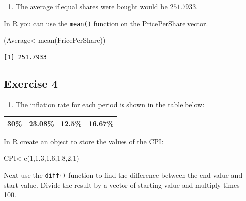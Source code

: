 \documentclass[
  letterpaper,
  DIV=11,
  numbers=noendperiod]{scrreprt}
\newenvironment{Shaded}{\begin{snugshade}}{\end{snugshade}}
\newcommand{\DecValTok}[1]{\textcolor[rgb]{0.68,0.00,0.00}{#1}}
\newcommand{\FloatTok}[1]{\textcolor[rgb]{0.68,0.00,0.00}{#1}}
\newcommand{\FunctionTok}[1]{\textcolor[rgb]{0.28,0.35,0.67}{#1}}
\newcommand{\NormalTok}[1]{\textcolor[rgb]{0.00,0.23,0.31}{#1}}
\newcommand{\OtherTok}[1]{\textcolor[rgb]{0.00,0.23,0.31}{#1}}
\providecommand{\tightlist}{%
  \setlength{\itemsep}{0pt}\setlength{\parskip}{0pt}}\usepackage{longtable,booktabs,array}
\begin{document}
\begin{enumerate}
\def\labelenumi{\arabic{enumi}.}
\setcounter{enumi}{1}
\tightlist
\item
  The average if equal shares were bought would be \(251.7933\).
\end{enumerate}

In R you can use the \texttt{mean()} function on the PricePerShare
vector.

\begin{Shaded}
\begin{Highlighting}[numbers=left,,]
\NormalTok{(Average}\OtherTok{\textless{}{-}}\FunctionTok{mean}\NormalTok{(PricePerShare))}
\end{Highlighting}
\end{Shaded}

\begin{verbatim}
[1] 251.7933
\end{verbatim}

\hypertarget{exercise-4-1}{%
\subsection*{Exercise 4}\label{exercise-4-1}}

\begin{enumerate}
\def\labelenumi{\arabic{enumi}.}
\tightlist
\item
  The inflation rate for each period is shown in the table below:
\end{enumerate}

\begin{longtable}[]{@{}cccc@{}}
\toprule()
\endhead
30\% & 23.08\% & 12.5\% & 16.67\% \\
\bottomrule()
\end{longtable}

In R create an object to store the values of the CPI:

\begin{Shaded}
\begin{Highlighting}[numbers=left,,]
\NormalTok{CPI}\OtherTok{\textless{}{-}}\FunctionTok{c}\NormalTok{(}\DecValTok{1}\NormalTok{,}\FloatTok{1.3}\NormalTok{,}\FloatTok{1.6}\NormalTok{,}\FloatTok{1.8}\NormalTok{,}\FloatTok{2.1}\NormalTok{)}
\end{Highlighting}
\end{Shaded}

Next use the \texttt{diff()} function to find the difference between the
end value and start value. Divide the result by a vector of starting
value and multiply times 100.
\end{document}

